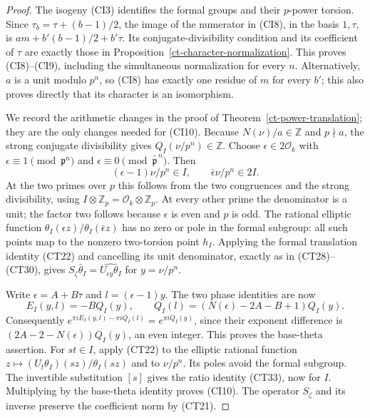 \begin{proof}
The isogeny (CI3) identifies the formal groups and their
$p$-power torsion.  Since
$\tau_b=\tau+(b-1)/2$, the image of the numerator in
(CI8), in the basis $1,\tau$, is
$am+b'(b-1)/2+b'\tau$.
Its conjugate-divisibility condition and its coefficient
of $\tau$ are exactly those in
Proposition~\ref{ct-character-normalization}.
This proves (CI8)--(CI9), including the simultaneous
normalization for every $n$.
Alternatively, $a$ is a unit modulo $p^n$, so (CI8)
has exactly one residue of $m$ for every $b'$; this
also proves directly that its character is an isomorphism.

We record the arithmetic changes in the proof of
Theorem~\ref{ct-power-translation}; they are the only
changes needed for (CI10).
Because $N(\nu)/a\in\mathbb Z$ and $p\nmid a$, the strong
conjugate divisibility gives
$Q_I(\nu/p^n)\in\mathbb Z$.
Choose $\epsilon\in2\mathcal O_k$ with
$\epsilon\equiv1\pmod{\mathfrak p^n}$ and
$\epsilon\equiv0\pmod{\bar{\mathfrak p}^{\,n}}$.
Then
\[
  (\epsilon-1)\nu/p^n\in I,\qquad
                  \bar\epsilon\nu/p^n\in2I.
 \tag{CI11}
\]
At the two primes over $p$ this follows from the two
congruences and the strong divisibility, using
$I\otimes\mathbb Z_p=\mathcal O_k\otimes\mathbb Z_p$.
At every other prime the denominator is a unit;
the factor two follows because $\epsilon$ is even and
$p$ is odd.
The rational elliptic function
$\theta_I(\epsilon z)/\theta_I(\bar\epsilon z)$ has no
zero or pole in the formal subgroup: all such points
map to the nonzero two-torsion point $h_I$.
Applying the formal translation identity (CT22) and
cancelling its unit denominator, exactly as in
(CT28)--(CT30), gives
$S_\zeta\widehat\theta_I
=\widehat{U_{\epsilon y}\theta_I}$ for $y=\nu/p^n$.

Write $\epsilon=A+B\tau$ and $l=(\epsilon-1)y$.
The two phase identities are now
\[
 E_I(y,l)=-B Q_I(y),\qquad
 Q_I(l)=(N(\epsilon)-2A-B+1)Q_I(y).
 \tag{CI12}
\]
Consequently
$e^{\pi iE_I(y,l)-\pi iQ_I(l)}
=e^{\pi iQ_I(y)}$, since their exponent difference
is $(2A-2-N(\epsilon))Q_I(y)$, an even integer.
This proves the base-theta assertion.
For $st\in I$, apply (CT22) to the elliptic rational
function
$z\mapsto(U_t\theta_I)(sz)/\theta_I(sz)$ and to
$\nu/p^n$.  Its poles avoid the formal subgroup.
The invertible substitution $[s]$ gives the ratio
identity (CT33), now for $I$.
Multiplying by the base-theta identity proves (CI10).
The operator $S_\zeta$ and its inverse preserve the
coefficient norm by (CT21).
\end{proof}

